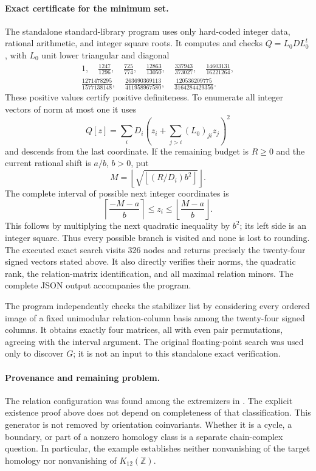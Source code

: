 \documentclass[11pt,a4paper]{article}
\theoremstyle{definition}
\begin{document}
\paragraph{Exact certificate for the minimum set.}
The standalone standard-library program
 uses only hard-coded integer
data, rational arithmetic, and integer square roots. It computes and
checks $Q=L_0D L_0^t$, with $L_0$ unit lower triangular and diagonal
\[
\begin{gathered}
1,\quad \frac{1247}{1296},\quad \frac{725}{774},\quad
\frac{12863}{13050},\quad \frac{337943}{373027},\quad
\frac{14603131}{16221264},\\
\frac{1271478295}{1577138148},\quad
\frac{263690369113}{411958967580},\quad
\frac{120536209775}{3164284429356}.
\end{gathered}
\]
These positive values certify positive definiteness. To enumerate
all integer vectors of norm at most one it uses
\[
 Q[z]=\sum_i D_i\left(z_i+\sum_{j>i}(L_0)_{ji}z_j\right)^2
\]
and descends from the last coordinate. If the remaining budget is
$R\geq0$ and the current rational shift is $a/b$, $b>0$, put
\[
 M=\left\lfloor\sqrt{\left\lfloor(R/D_i)b^2\right\rfloor}\right\rfloor.
\]
The complete interval of possible next integer coordinates is
\[
 \left\lceil\frac{-M-a}{b}\right\rceil
 \leq z_i\leq
 \left\lfloor\frac{M-a}{b}\right\rfloor.
\]
This follows by multiplying the next quadratic inequality by $b^2$;
its left side is an integer square. Thus every possible branch is
visited and none is lost to rounding. The executed exact search
visits 326 nodes and returns precisely the twenty-four signed
vectors stated above. It also directly verifies their norms, the
quadratic rank, the relation-matrix identification, and all maximal
relation minors. The complete JSON output accompanies the program.

The program independently checks the stabilizer list by considering
every ordered image of a fixed unimodular relation-column basis among
the twenty-four signed columns. It obtains exactly four matrices,
all with even pair permutations, agreeing with the interval argument.
The original floating-point search was used only to discover $G$;
it is not an input to this standalone exact verification.

\paragraph{Provenance and remaining problem.}
The relation configuration was found among the extremizers in
\cite[\S5.2 and Tables~1,3, p.~85]{AverkovSchymura2024}. The explicit
existence proof above does not depend on completeness of that
classification. This generator is not removed by orientation
coinvariants. Whether it is a cycle, a boundary, or part of a nonzero
homology class is a separate chain-complex question. In particular,
the example establishes neither nonvanishing of the target homology
nor nonvanishing of $K_{12}(\mathbb Z)$.
\end{document}
